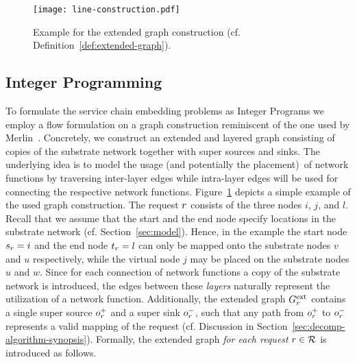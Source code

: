 \documentclass[10pt, conference, letterpaper]{IEEEtran}
\begin{document}
\begin{figure}[t!]
\texttt{[image: line-construction.pdf]}
\caption{Example for the extended graph construction (cf. Definition~\ref{def:extended-graph}).}
\label{fig:extended-graph-linear}
\end{figure}

\subsection{Integer Programming}
\label{sec:integer-linear-program}

To formulate the service chain embedding problems as Integer Programs we employ a flow formulation on a graph construction reminiscent of the one used by Merlin~\cite{merlin}. Concretely, we construct an extended and layered graph consisting of copies of the substrate network together with super sources and sinks. The underlying idea is to model the usage (and potentially the placement)~of network functions by traversing inter-layer edges while intra-layer edges will be used for connecting the respective network functions. Figure~\ref{fig:extended-graph-linear} depicts a simple example of the used graph construction. The request $r$ consists of the three nodes $i$, $j$, and $l$. Recall that we assume that the start and the end node specify locations in the substrate network (cf. Section~\ref{sec:model}). Hence, in the example the start node $s_r = i$ and the end node $t_r = l$ can only be mapped onto the substrate nodes $v$ and $u$ respectively, while the virtual node $j$ may be placed on the substrate nodes $u$ and $w$. Since for each connection of network functions a copy of the substrate network is introduced, the edges between these \emph{layers} naturally represent the utilization of a network function.
Additionally, the extended graph $G^{\textnormal{ext}}_{r}$ contains a single super source $o^+_{r}$ and a super sink $o^-_{r}$, such that any path from $o^+_{r}$ to $o^-_{r}$ represents a valid mapping of the request (cf. Discussion in Section~\ref{sec:decomp-algorithm-synopsis}). Formally, the extended graph \emph{for each request} $r \in \mathcal{R}$ is introduced as follows.
\end{document}
